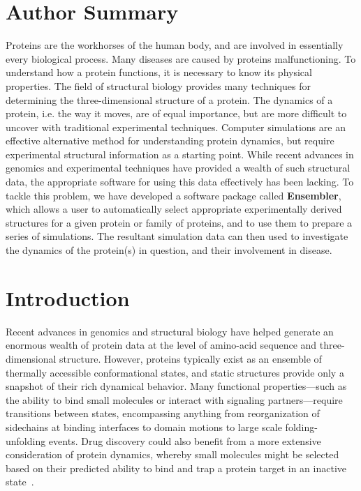 \documentclass[aps,prl,preprint,nofootinbib,superscriptaddress,linenumbers]{revtex4-1}
\begin{document}

\section*{Author Summary}
\label{section:author_summary}

Proteins are the workhorses of the human body, and are involved in essentially every biological process.
Many diseases are caused by proteins malfunctioning.
To understand how a protein functions, it is necessary to know its physical properties.
The field of structural biology provides many techniques for determining the three-dimensional structure of a protein.
The dynamics of a protein, i.e. the way it moves, are of equal importance, but are more difficult to uncover with traditional experimental techniques.
Computer simulations are an effective alternative method for understanding protein dynamics, but require experimental structural information as a starting point.
While recent advances in genomics and experimental techniques have provided a wealth of such structural data, the appropriate software for using this data effectively has been lacking.
To tackle this problem, we have developed a software package called {\bf Ensembler}, which allows a user to automatically select appropriate experimentally derived structures for a given protein or family of proteins, and to use them to prepare a series of simulations.
The resultant simulation data can then used to investigate the dynamics of the protein(s) in question, and their involvement in disease.

\section{Introduction}
\label{section:introduction}

Recent advances in genomics and structural biology have helped generate an enormous wealth of protein data at the level of amino-acid sequence and three-dimensional structure.
However, proteins typically exist as an ensemble of thermally accessible conformational states, and static structures provide only a snapshot of their rich dynamical behavior.
Many functional properties---such as the ability to bind small molecules or interact with signaling partners---require transitions between states, encompassing anything from reorganization of sidechains at binding interfaces to domain motions to large scale folding-unfolding events.
Drug discovery could also benefit from a more extensive consideration of protein dynamics, whereby small molecules might be selected based on their predicted ability to bind and trap a protein target in an inactive state~\cite{craik:science:2009:trapping-moving-targets}.
\end{document}
